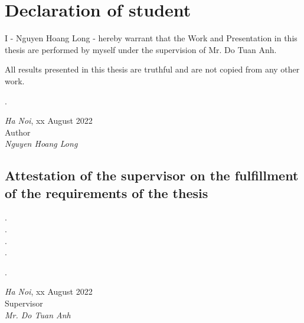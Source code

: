 \pagebreak

\section*{Declaration of student}
I - Nguyen Hoang Long - hereby warrant that the Work and Presentation in this thesis are
performed by myself under the supervision of Mr. Do Tuan Anh.

All results presented in this thesis are truthful and are not copied from any other work.
\begin{minipage}{0.5\textwidth}
.
\end{minipage}
\begin{minipage}[t]{0.5\textwidth}



\begin{center}
  \textit{Ha Noi}, xx August 2022\\
  Author\\[3cm]
  
  \textit{Nguyen Hoang Long}
\end{center}
\end{minipage}
\subsection*{Attestation of the supervisor on the fulfillment of the requirements of the thesis}
.\dotfill \\
.\dotfill \\ 
.\dotfill \\ 
.\dotfill \\
\begin{minipage}{0.5\textwidth}
.
\end{minipage}
\begin{minipage}[t]{0.5\textwidth}

\begin{center}
  \textit{Ha Noi}, xx August 2022\\
  Supervisor\\[3cm]
  
  \textit{Mr. Do Tuan Anh}
\end{center}
\end{minipage}

\pagebreak
